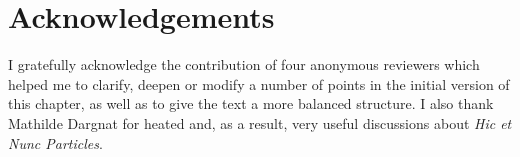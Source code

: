 \documentclass[output=paper,colorlinks,citecolor=brown]{langscibook}
\begin{document}
\section*{Acknowledgements}

I gratefully acknowledge the contribution of four anonymous reviewers which helped me to clarify, deepen or modify a number of points in the initial version of this chapter, as well as to give the text a more balanced structure. I also thank Mathilde Dargnat for heated and, as a result, very useful discussions about \textit{Hic et Nunc Particles}.

	\sloppy
	\printbibliography[heading=subbibliography,notkeyword=this]
\end{document}
